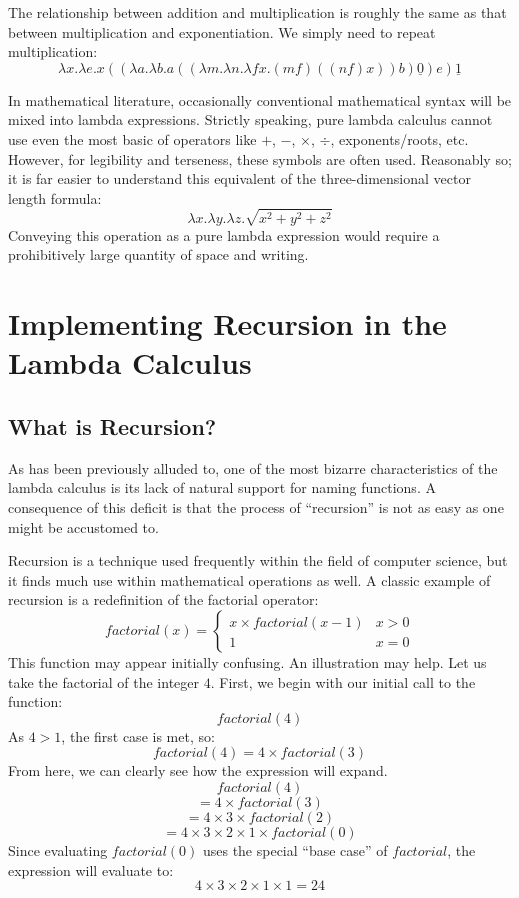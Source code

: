 \documentclass[twocolumn,titlepage,12pt]{article}
\begin{document}
The relationship between addition and multiplication is roughly the same as that between multiplication and exponentiation. We simply need to repeat multiplication:
$$\lambda x.\lambda e.x ((\lambda a.\lambda b.a ((\lambda m.\lambda n.\lambda fx.(m f) ((n f) x)) b) \underline{0}) e) \underline{1}$$

In mathematical literature, occasionally conventional mathematical syntax will be mixed into lambda expressions. Strictly speaking, pure lambda calculus cannot use even the most basic of operators like $+$, $-$, $\times$, $\div$, exponents/roots, etc. However, for legibility and terseness, these symbols are often used. Reasonably so; it is far easier to understand this equivalent of the three-dimensional vector length formula:
$$\lambda x.\lambda y.\lambda z.\sqrt{x^2+y^2+z^2}$$
Conveying this operation as a pure lambda expression would require a prohibitively large quantity of space and writing.

\section{Implementing Recursion in the Lambda Calculus}
\subsection{What is Recursion?}
As has been previously alluded to, one of the most bizarre characteristics of the lambda calculus is its lack of natural support for naming functions. A consequence of this deficit is that the process of ``recursion'' is not as easy as one might be accustomed to.

Recursion is a technique used frequently within the field of computer science, but it finds much use within mathematical operations as well. A classic example of recursion is a redefinition of the factorial operator:
\[
factorial(x)=
\begin{cases}
    x\times factorial(x-1) & x>0 \\
    1 & x=0
\end{cases}
\]
This function may appear initially confusing. An illustration may help. Let us take the factorial of the integer $4$. First, we begin with our initial call to the function:
$$factorial(4)$$
As $4>1$, the first case is met, so:
$$factorial(4)=4\times factorial(3)$$
From here, we can clearly see how the expression will expand.
$$factorial(4)$$
$$=4\times factorial(3)$$
$$=4\times 3\times factorial(2)$$
$$=4\times 3\times 2\times 1\times factorial(0)$$
Since evaluating $factorial(0)$ uses the special ``base case'' of $factorial$, the expression will evaluate to:
$$4\times 3\times 2\times 1\times 1=24$$
\end{document}

